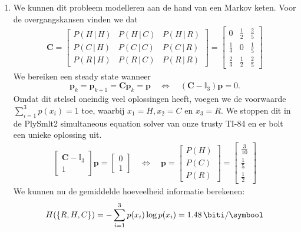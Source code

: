 \documentclass{kuburgiearticle}
\begin{document}
	\begin{enumerate}

		\item We kunnen dit probleem modelleren aan de hand van een Markov keten. Voor de overgangskansen vinden we dat \begin{align*}
			\mathbf{C} = \begin{bmatrix}
				P(H\, | \,H) & P(H\, | \,C) & P(H\, | \,R) \\
				P(C\, | \,H) & P(C\, | \,C) & P(C\, | \,R) \\
				P(R\, | \,H) & P(R\, | \,C) & P(R\, | \,R)
			\end{bmatrix} = \begin{bmatrix}
				0 			& \frac{1}{2} 	& \frac{2}{5} \\
				\frac{1}{3} & 0 			& \frac{1}{5} \\
				\frac{2}{3} & \frac{1}{2}	& \frac{2}{5}
			\end{bmatrix}
		\end{align*}We bereiken een steady state wanneer \[\mathbf{p}_k = \mathbf{p}_{k+1} = \mathbf{C}\mathbf{p}_k = \mathbf{p} \quad \Longleftrightarrow \quad (\mathbf{C}-\mathbb{I}_3)\mathbf{p}=0.\] Omdat dit stelsel oneindig veel oplossingen heeft, voegen we de voorwaarde \(\sum_{i=1}^{3} p(x_i) = 1\) toe, waarbij \(x_1=H, x_2=C\) en \(x_3=R\). We stoppen dit in de PlySmlt2 simultaneous equation solver van onze trusty TI-84 en er bolt een unieke oplossing uit. \begin{align*}
			\begin{bmatrix}
				\mathbf{C} - \mathbb{I}_3 \\
				1
			\end{bmatrix}\mathbf{p} = \begin{bmatrix}
			0 \\
			1
			\end{bmatrix} \quad \Longleftrightarrow \quad \mathbf{p} = \begin{bmatrix}
			P(H)\\
			P(C)\\
			P(R)
			\end{bmatrix} = \begin{bmatrix}
			\frac{3}{10}\\
			\frac{1}{5}\\
			\frac{1}{2}
			\end{bmatrix}
		\end{align*}
		We kunnen nu de gemiddelde hoeveelheid informatie berekenen:
		\begin{align*}
			H(\{R,H,C\}) = - \sum_{i=1}^{3} p(x_i) \log p(x_i) = \SI{1.48}{\biti\per\symbool}
		\end{align*}


\end{enumerate}
\end{document}
